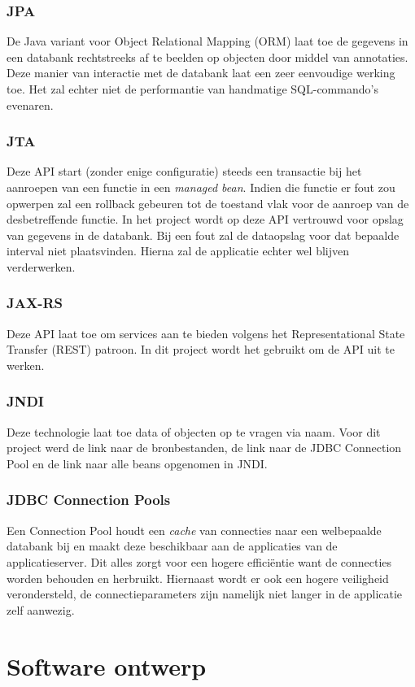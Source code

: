 \documentclass[ps,a4paper,oneside]{report}
\begin{document}
\subsubsection{JPA}
De Java variant voor Object Relational Mapping (ORM) laat toe de gegevens in een databank rechtstreeks af te beelden op objecten door middel van annotaties. Deze manier van interactie met de databank laat een zeer eenvoudige werking toe. Het zal echter niet de performantie van handmatige SQL-commando's evenaren.
\subsubsection{JTA}
Deze API start (zonder enige configuratie) steeds een transactie bij het aanroepen van een functie in een \textit{managed bean}. Indien die functie er fout zou opwerpen zal een rollback gebeuren tot de toestand vlak voor de aanroep van de desbetreffende functie. In het project wordt op deze API vertrouwd voor opslag van gegevens in de databank. Bij een fout zal de dataopslag voor dat bepaalde interval niet plaatsvinden. Hierna zal de applicatie echter wel blijven verderwerken.
\subsubsection{JAX-RS}
Deze API laat toe om services aan te bieden volgens het Representational State Transfer (REST) patroon. In dit project wordt het gebruikt om de API uit te werken.
\subsubsection{JNDI}
Deze technologie laat toe data of objecten op te vragen via naam. Voor dit project werd de link naar de bronbestanden, de link naar de JDBC Connection Pool en de link naar alle beans opgenomen in JNDI.
\subsubsection{JDBC Connection Pools}
Een Connection Pool houdt een \textit{cache} van connecties naar een welbepaalde databank bij en maakt deze beschikbaar aan de applicaties van de applicatieserver. Dit alles zorgt voor een hogere effici\"entie want de connecties worden behouden en herbruikt. Hiernaast wordt er ook een hogere veiligheid verondersteld, de connectieparameters zijn namelijk niet langer in de applicatie zelf aanwezig.
\section{Software ontwerp}
\end{document}
